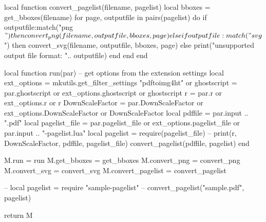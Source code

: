 local function convert_pagelist(filename, pagelist)
  local bboxes = get_bboxes(filename)
  for page, outputfile in pairs(pagelist) do
    if outputfile:match("png$") then
      convert_png(filename, outputfile, bboxes, page)
    elseif outputfile:match("svg$") then
      convert_svg(filename, outputfile, bboxes, page)
    else 
      print("unsupported output file format: ".. outputfile)
    end
  end
end

local function run(par)
  -- get options from the extension settings
  local ext_options = mkutils.get_filter_settings "pdftoimg4ht" or {}
  ghostscript = par.ghostscript or ext_options.ghostscript or ghostscript
  r = par.r or ext_options.r or r
  DownScaleFactor = par.DownScaleFactor or ext_options.DownScaleFactor or DownScaleFactor
  local pdffile = par.input .. ".pdf"
  local pagelist_file = par.pagelist_file or ext_options.pagelist_file or par.input .. "-pagelist.lua"
  local pagelist = require(pagelist_file)
  -- print(r, DownScaleFactor, pdffile, pagelist_file)
  convert_pagelist(pdffile, pagelist)
end




M.run = run
M.get_bboxes = get_bboxes
M.convert_png = convert_png
M.convert_svg = convert_svg
M.convert_pagelist = convert_pagelist

-- local pagelist = require "sample-pagelist"
-- convert_pagelist("sample.pdf", pagelist)

return M